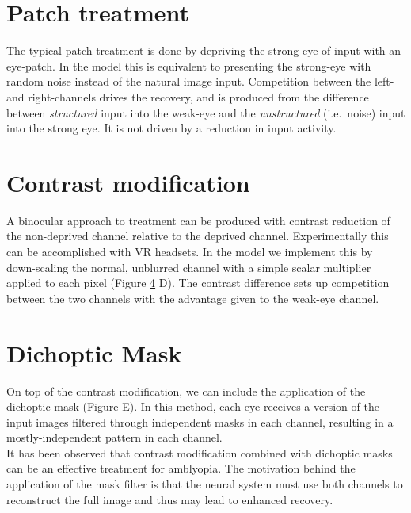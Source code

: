 \documentclass[
  letterpaper,
  number]{elsarticle}
\begin{document}
\hypertarget{patch-treatment}{%
\section{Patch treatment}\label{patch-treatment}}

The typical patch treatment is done by depriving the strong-eye of input
with an eye-patch. In the model this is equivalent to presenting the
strong-eye with random noise instead of the natural image input.
Competition between the left- and right-channels drives the recovery,
and is produced from the difference between \emph{structured} input into
the weak-eye and the \emph{unstructured} (i.e.~noise) input into the
strong eye. It is not driven by a reduction in input activity.

\hypertarget{contrast-modification}{%
\section{Contrast modification}\label{contrast-modification}}

A binocular approach to treatment can be produced with contrast
reduction of the non-deprived channel relative to the deprived channel.
Experimentally this can be accomplished with VR
headsets\citep{xiao2020improved}. In the model we implement this by
down-scaling the normal, unblurred channel with a simple scalar
multiplier applied to each pixel (Figure
\protect\hyperlink{fig:input}{4} D). The contrast difference sets up
competition between the two channels with the advantage given to the
weak-eye channel.

\hypertarget{dichoptic-mask}{%
\section{Dichoptic Mask}\label{dichoptic-mask}}

On top of the contrast modification, we can include the application of
the dichoptic mask (Figure \citep{fig:input} E). In this method, each
eye receives a version of the input images filtered through independent
masks in each channel, resulting in a mostly-independent pattern in each
channel.\\
It has been observed that contrast modification combined with dichoptic
masks can be an effective treatment for
amblyopia\citep[\citep{xiao2021randomized}]{Li:2015aa}. The motivation
behind the application of the mask filter is that the neural system must
use both channels to reconstruct the full image and thus may lead to
enhanced recovery.
\end{document}
